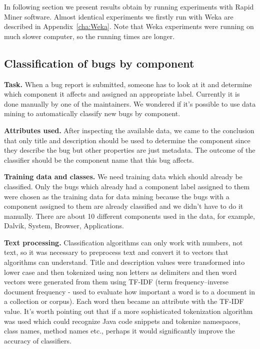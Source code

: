 In following section we present results obtain by running experiments with Rapid Miner software. Almost identical experiments we firstly run with Weka are described in Appendix~\ref{cha:Weka}. Note that Weka experiments were running on much slower computer, so the running times are longer. 

\subsection{Classification of bugs by component} %
\label{sub:Classification of bugs bugs by component}

{\bf Task.} When a bug report is submitted, someone has to look at it and determine which component it affects and assigned an appropriate label. Currently it is done manually by one of the maintainers. We wondered if it's possible to use data mining to automatically classify new bugs by component.

{\bf Attributes used.} After inspecting the available data, we came to the conclusion that only title and description should be used to determine the component since they describe the bug but other properties are just metadata. The outcome of the classifier should be the component name that this bug affects.

{\bf Training data and classes.} We need training data which should already be classified. Only the bugs which already had a component label assigned to them were chosen as the training data for data mining because the bugs with a component assigned to them are already classified and we didn't have to do it manually. There are about 10 different components used in the data, for example, Dalvik, System, Browser, Applications.

{\bf Text processing.} Classification algorithms can only work with numbers, not text, so it was necessary to preprocess text and convert it to vectors that algorithms can understand. Title and description values were transformed into lower case and then tokenized using non letters as delimiters and then word vectors were generated from them using TF-IDF (term frequency–inverse document frequency - used to evaluate how important a word is to a document in a collection or corpus). Each word then became an attribute with the TF-IDF value. It's worth pointing out that if a more sophisticated tokenization algorithm was used which could recognize Java code snippets and tokenize namespaces, class names, method names etc., perhaps it would significantly improve the accuracy of classifiers.

